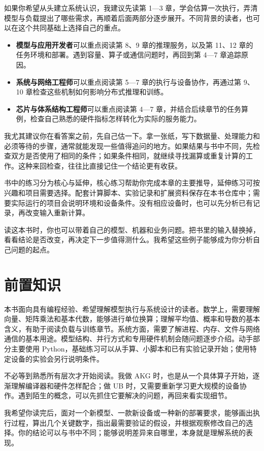 如果你希望从头建立系统认识，我建议先读第 1---3
章，学会估算一次执行，弄清模型与负载提出了哪些需求，再顺着后面两部分逐步展开。不同背景的读者，也可以在这个共同基础上选择自己的重点。

\begin{itemize}
\tightlist
\item
  \textbf{模型与应用开发者}可以重点阅读第 8、9 章的推理服务，以及第
  11、12 章的任务环境和部署。遇到容量、算子或通信问题时，再回到第 4---7
  章追踪原因。
\item
  \textbf{系统与网络工程师}可以重点阅读第 5---7
  章的执行与设备协作，再通过第 9、10
  章检查这些机制如何影响分布式推理和训练。
\item
  \textbf{芯片与体系结构工程师}可以重点阅读第 4---7
  章，并结合后续章节的任务算例，检查自己熟悉的硬件指标怎样转化为实际的服务能力。
\end{itemize}

我尤其建议你在看答案之前，先自己估一下。拿一张纸，写下数据量、处理能力和必须等待的步骤，通常就能发现一些值得追问的地方。如果结果与书中不同，先检查双方是否使用了相同的条件；如果条件相同，就继续寻找漏算或重复计算的工作。这种来回检查，往往比直接记住一个结论更有收获。

书中的练习分为核心与延伸，核心练习帮助你完成本章的主要推导，延伸练习可按兴趣和项目需要选择。配套计算脚本、实验记录和扩展资料保存在本书仓库中；需要实际运行的项目会说明环境和设备条件。没有相应设备时，也可以先分析已有记录，再改变输入重新计算。

读这本书时，你也可以带着自己的模型、机器和业务问题。把书里的输入替换掉，看看结论是否改变，再决定下一步值得测什么。我希望这些例子能够成为你分析自己问题的起点。

\section*{前置知识}\label{ux524dux7f6eux77e5ux8bc6}

本书面向具有编程经验、希望理解模型执行与系统设计的读者。数学上，需要理解向量、矩阵乘法和基本代数，能够进行单位换算；理解平均值、概率和导数的基本含义，有助于阅读负载与训练章节。系统方面，需要了解进程、内存、文件与网络通信的基本用途。模型结构、并行方式和专用硬件机制会随问题逐步介绍。动手部分主要使用
Python，基础练习可以从手算、小脚本和已有实验记录开始；使用特定设备的实验会另行说明条件。

不必等到熟悉所有层次才开始阅读。我做 AKG
时，也是从一个具体算子开始，逐渐理解编译器和硬件怎样配合；做 UB
时，又需要重新学习更大规模的设备协作。遇到陌生的概念，可以先抓住它要解决的问题，再回来看实现细节。

我希望你读完后，面对一个新模型、一款新设备或一种新的部署要求，能够画出执行过程，算出几个关键数字，指出最需要验证的假设，并根据观察修改自己的选择。你的结论可以与书中不同；能够说明差异来自哪里，本身就是理解系统的表现。
